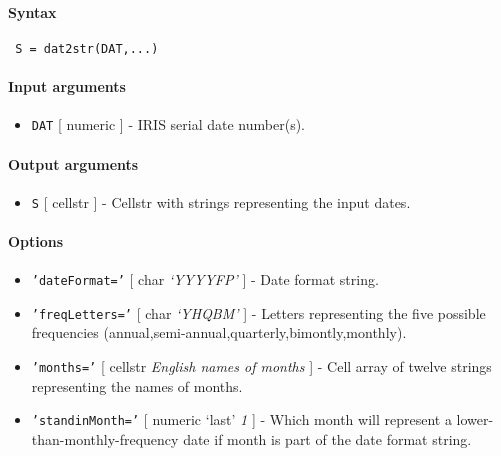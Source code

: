 


	\paragraph{Syntax}
 
 \begin{verbatim}
 S = dat2str(DAT,...)
 \end{verbatim}
 
 \paragraph{Input arguments}
 
 \begin{itemize}
 \item
   \texttt{DAT} {[} numeric {]} - IRIS serial date number(s).
 \end{itemize}
 
 \paragraph{Output arguments}
 
 \begin{itemize}
 \item
   \texttt{S} {[} cellstr {]} - Cellstr with strings representing the
   input dates.
 \end{itemize}
 
 \paragraph{Options}
 
 \begin{itemize}
 \item
   \texttt{'dateFormat='} {[} char \textbar{} \emph{`YYYYFP'} {]} - Date
   format string.
 \item
   \texttt{'freqLetters='} {[} char \textbar{} \emph{`YHQBM'} {]} -
   Letters representing the five possible frequencies
   (annual,semi-annual,quarterly,bimontly,monthly).
 \item
   \texttt{'months='} {[} cellstr \textbar{} \emph{English names of
   months} {]} - Cell array of twelve strings representing the names of
   months.
 \item
   \texttt{'standinMonth='} {[} numeric \textbar{} `last' \textbar{}
   \emph{1} {]} - Which month will represent a
   lower-than-monthly-frequency date if month is part of the date format
   string.
 \end{itemize}
 
